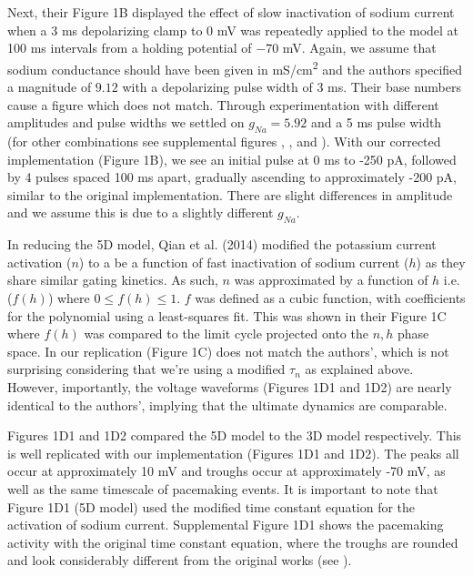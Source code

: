 Next, their Figure 1B displayed the effect of slow inactivation of sodium current when a 3 ms depolarizing clamp to 0 mV was repeatedly applied to the model at 100 ms intervals from a holding potential of $-70$ mV. Again, we assume that sodium conductance should have been given in mS/cm\textsuperscript{2} and the authors specified a magnitude of $9.12$ with a depolarizing pulse width of 3 ms. Their base numbers cause a figure which does not match. Through experimentation with different amplitudes and pulse widths we settled on $g_{Na}=5.92$ and a 5 ms pulse width (for other combinations see supplemental figures , , and ). With our corrected implementation (Figure 1B), we see an initial pulse at 0 ms to -250 pA, followed by 4 pulses spaced 100 ms apart, gradually ascending to approximately -200 pA, similar to the original implementation. There are slight differences in amplitude and we assume this is due to a slightly different $g_{Na}$.

In reducing the 5D model, Qian et al. (2014) modified the potassium current activation ($n$) to a be a function of fast inactivation of sodium current ($h$) as they share similar gating kinetics. As such, $n$ was approximated by a function of $h$ i.e. ($f(h)$) where $0\leq f(h)\leq 1$. $f$ was defined as a cubic function, with coefficients for the polynomial using a least-squares fit. This was shown in their Figure 1C where $f(h)$ was compared to the limit cycle projected onto the $n, h$ phase space. In our replication (Figure 1C) does not match the authors', which is not surprising considering that we're using a modified $\tau_n$ as explained above. However, importantly, the voltage waveforms (Figures 1D1 and 1D2) are nearly identical to the authors', implying that the ultimate dynamics are comparable. 

Figures 1D1 and 1D2 compared the 5D model to the 3D model respectively. This is well replicated with our implementation (Figures 1D1 and 1D2). The peaks all occur at approximately 10 mV and troughs occur at approximately -70 mV, as well as the same timescale of pacemaking events. It is important to note that Figure 1D1 (5D model) used the modified time constant equation for the activation of sodium current. Supplemental Figure 1D1 shows the pacemaking activity with the original time constant equation, where the troughs are rounded and look considerably different from the original works (see ).

